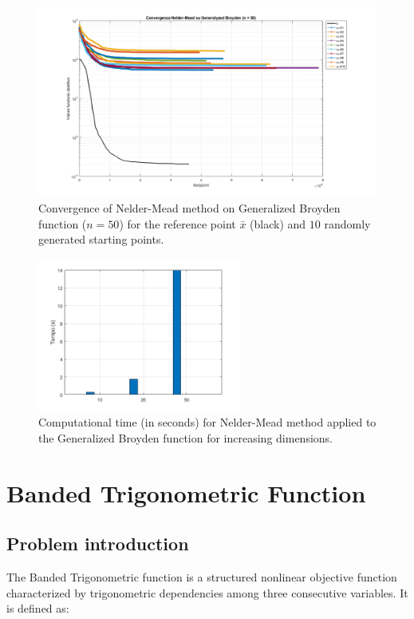 \documentclass[a4paper,12pt]{article}
\begin{document}
	\begin{figure}[H]%
		\centering
		\includegraphics[width=\textwidth]{../immagini/broyden_50.png}
		\caption{Convergence of Nelder-Mead method on Generalized Broyden function ($n=50$) for the reference point $\bar{x}$ (black) and $10$ randomly generated starting points.}
		\label{fig:gb_nelder_50}
	\end{figure}
	
	\begin{figure}[H]%
		\centering
		\includegraphics[width=0.6\textwidth]{../immagini/broyden_time_nelder.png}
		\caption{Computational time (in seconds) for Nelder-Mead method applied to the Generalized Broyden function for increasing dimensions.}
		\label{fig:gb_nelder_time}
	\end{figure}
	
	
	\section{Banded Trigonometric Function}
	\subsection{Problem introduction}
	The Banded Trigonometric function is a structured nonlinear objective function characterized by trigonometric dependencies among three consecutive variables. It is defined as:
	
\end{document}
